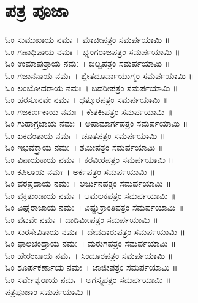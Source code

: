 \section{ಪತ್ರ ಪೂಜಾ }
ಓಂ ಸುಮುಖಾಯ ನಮಃ~। ಮಾಚೀಪತ್ರಂ ಸಮರ್ಪಯಾಮಿ ॥\\
ಓಂ ಗಣಾಧಿಪಾಯ ನಮಃ~। ಭೃಂಗರಾಜಪತ್ರಂ ಸಮರ್ಪಯಾಮಿ ॥\\
ಓಂ ಉಮಾಪುತ್ರಾಯ ನಮಃ~। ಬಿಲ್ವಪತ್ರಂ ಸಮರ್ಪಯಾಮಿ ॥\\
ಓಂ ಗಜಾನನಾಯ ನಮಃ~। ಶ್ವೇತದೂರ್ವಾಯುಗ್ಮಂ ಸಮರ್ಪಯಾಮಿ ॥\\
ಓಂ ಲಂಬೋದರಾಯ ನಮಃ~। ಬದರೀಪತ್ರಂ ಸಮರ್ಪಯಾಮಿ ॥\\
ಓಂ ಹರಸೂನವೇ ನಮಃ~। ಧತ್ತೂರಪತ್ರಂ ಸಮರ್ಪಯಾಮಿ ॥\\
ಓಂ ಗಜಕರ್ಣಕಾಯ ನಮಃ~। ಕೇತಕೀಪತ್ರಂ ಸಮರ್ಪಯಾಮಿ ॥\\
ಓಂ ಗುಹಾಗ್ರಜಾಯ ನಮಃ~। ಅಪಾಮಾರ್ಗಪತ್ರಂ ಸಮರ್ಪಯಾಮಿ ॥\\
ಓಂ ಏಕದಂತಾಯ ನಮಃ~। ಚೂತಪತ್ರಂ ಸಮರ್ಪಯಾಮಿ ॥\\
ಓಂ ಇಭವಕ್ತ್ರಾಯ ನಮಃ~। ಶಮೀಪತ್ರಂ ಸಮರ್ಪಯಾಮಿ ॥\\
ಓಂ ವಿನಾಯಕಾಯ ನಮಃ~। ಕರವೀರಪತ್ರಂ ಸಮರ್ಪಯಾಮಿ ॥\\
ಓಂ ಕಪಿಲಾಯ ನಮಃ~। ಅರ್ಕಪತ್ರಂ ಸಮರ್ಪಯಾಮಿ ॥\\
ಓಂ ವರಪ್ರದಾಯ ನಮಃ~। ಅರ್ಜುನಪತ್ರಂ ಸಮರ್ಪಯಾಮಿ ॥\\
ಓಂ ವಕ್ರತುಂಡಾಯ ನಮಃ~। ಆಮಲಕಪತ್ರಂ ಸಮರ್ಪಯಾಮಿ ॥\\
ಓಂ ವಿಘ್ನರಾಜಾಯ ನಮಃ~। ವಿಷ್ಣುಕ್ರಾಂತಿಪತ್ರಂ ಸಮರ್ಪಯಾಮಿ ॥\\
ಓಂ ವಟವೇ ನಮಃ~। ದಾಡಿಮೀಪತ್ರಂ ಸಮರ್ಪಯಾಮಿ ॥\\
ಓಂ ಸುರಸೇವಿತಾಯ ನಮಃ~। ದೇವದಾರುಪತ್ರಂ ಸಮರ್ಪಯಾಮಿ ॥\\
ಓಂ ಫಾಲಚಂದ್ರಾಯ ನಮಃ~। ಮರುಗಪತ್ರಂ ಸಮರ್ಪಯಾಮಿ ॥\\
ಓಂ ಹೇರಂಬಾಯ ನಮಃ~। ಸಿಂದೂರಪತ್ರಂ ಸಮರ್ಪಯಾಮಿ ॥\\
ಓಂ ಶೂರ್ಪಕರ್ಣಾಯ ನಮಃ~। ಜಾಜೀಪತ್ರಂ ಸಮರ್ಪಯಾಮಿ ॥\\
ಓಂ ಸರ್ವೇಶ್ವರಾಯ ನಮಃ~। ಅಗಸ್ತ್ಯಪತ್ರಂ ಸಮರ್ಪಯಾಮಿ ॥\\
ಪತ್ರಪೂಜಾಂ ಸಮರ್ಪಯಾಮಿ ॥
